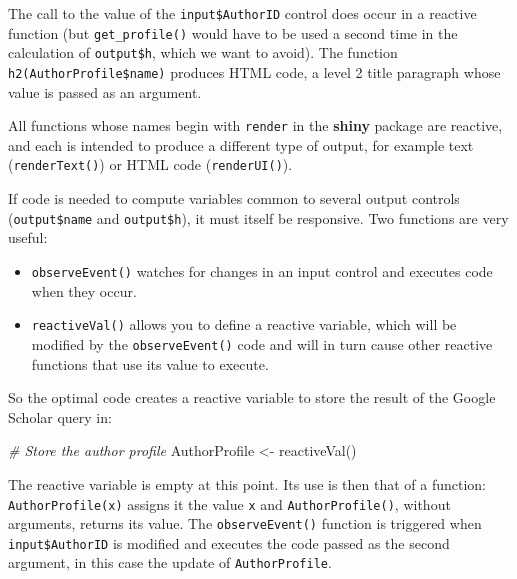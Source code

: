 \documentclass[
  12pt,
  american,
  a4paper,
  extrafontsizes,onecolumn,openright
  ]{memoir}
\newenvironment{Shaded}{\begin{snugshade}}{\end{snugshade}}
\newcommand{\CommentTok}[1]{\textcolor[rgb]{0.56,0.35,0.01}{\textit{#1}}}
\newcommand{\FunctionTok}[1]{\textcolor[rgb]{0.00,0.00,0.00}{#1}}
\newcommand{\NormalTok}[1]{#1}
\newcommand{\OtherTok}[1]{\textcolor[rgb]{0.56,0.35,0.01}{#1}}
\providecommand{\tightlist}{%
  \setlength{\itemsep}{0pt}\setlength{\parskip}{0pt}}
\begin{document}
\normalsize

The call to the value of the \texttt{input\$AuthorID} control does occur in a reactive function (but \texttt{get\_profile()} would have to be used a second time in the calculation of \texttt{output\$h}, which we want to avoid).
The function \texttt{h2(AuthorProfile\$name)} produces HTML code, a level 2 title paragraph whose value is passed as an argument.

All functions whose names begin with \texttt{render} in the \textbf{shiny} package are reactive, and each is intended to produce a different type of output, for example text (\texttt{renderText()}) or HTML code (\texttt{renderUI()}).

If code is needed to compute variables common to several output controls (\texttt{output\$name} and \texttt{output\$h}), it must itself be responsive.
Two functions are very useful:

\begin{itemize}
\tightlist
\item
  \texttt{observeEvent()} watches for changes in an input control and executes code when they occur.
\item
  \texttt{reactiveVal()} allows you to define a reactive variable, which will be modified by the \texttt{observeEvent()} code and will in turn cause other reactive functions that use its value to execute.
\end{itemize}

So the optimal code creates a reactive variable to store the result of the Google Scholar query in:

\scriptsize

\begin{Shaded}
\begin{Highlighting}[]
\CommentTok{\# Store the author profile}
\NormalTok{AuthorProfile }\OtherTok{\textless{}{-}} \FunctionTok{reactiveVal}\NormalTok{()}
\end{Highlighting}
\end{Shaded}

\normalsize

The reactive variable is empty at this point.
Its use is then that of a function: \texttt{AuthorProfile(x)} assigns it the value \texttt{x} and \texttt{AuthorProfile()}, without arguments, returns its value.
The \texttt{observeEvent()} function is triggered when \texttt{input\$AuthorID} is modified and executes the code passed as the second argument, in this case the update of \texttt{AuthorProfile}.
\end{document}
